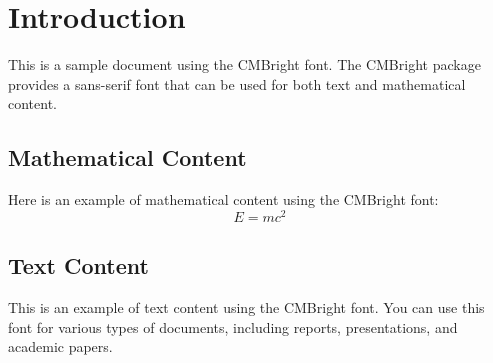 \documentclass{article}
\begin{document}
\section{Introduction}
This is a sample document using the CMBright font. The CMBright package provides a sans-serif font that can be used for both text and mathematical content.

\subsection{Mathematical Content}
Here is an example of mathematical content using the CMBright font:
\[ E = mc^2 \]

\subsection{Text Content}
This is an example of text content using the CMBright font. You can use this font for various types of documents, including reports, presentations, and academic papers.
\end{document}
